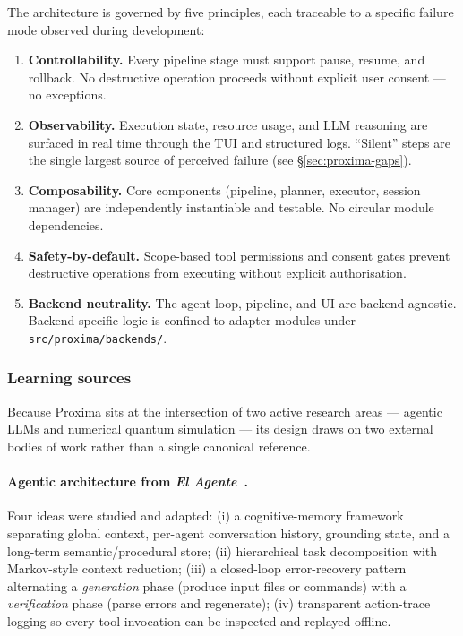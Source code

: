 \documentclass[11pt,a4paper]{article}
\begin{document}
The architecture is governed by five principles, each traceable to a specific
failure mode observed during development:

\begin{enumerate}[leftmargin=1.5cm]
  \item \textbf{Controllability.} Every pipeline stage must support pause, resume,
        and rollback. No destructive operation proceeds without explicit user
        consent --- no exceptions.
  \item \textbf{Observability.} Execution state, resource usage, and LLM
        reasoning are surfaced in real time through the TUI and structured logs.
        ``Silent'' steps are the single largest source of perceived failure (see
        §\ref{sec:proxima-gaps}).
  \item \textbf{Composability.} Core components (pipeline, planner, executor,
        session manager) are independently instantiable and testable. No circular
        module dependencies.
  \item \textbf{Safety-by-default.} Scope-based tool permissions and consent
        gates prevent destructive operations from executing without explicit
        authorisation.
  \item \textbf{Backend neutrality.} The agent loop, pipeline, and UI are
        backend-agnostic. Backend-specific logic is confined to adapter modules
        under \texttt{src/proxima/backends/}.
\end{enumerate}

\subsubsection*{Learning sources}

Because Proxima sits at the intersection of two active research areas --- agentic
LLMs and numerical quantum simulation --- its design draws on two external
bodies of work rather than a single canonical reference.

\paragraph{Agentic architecture from \emph{El Agente}~\cite{zou2025elagente}.}
Four ideas were studied and adapted: (i) a cognitive-memory framework separating
global context, per-agent conversation history, grounding state, and a long-term
semantic/procedural store; (ii) hierarchical task decomposition with Markov-style
context reduction; (iii) a closed-loop error-recovery pattern alternating a
\emph{generation} phase (produce input files or commands) with a
\emph{verification} phase (parse errors and regenerate); (iv) transparent
action-trace logging so every tool invocation can be inspected and replayed
offline.
\end{document}
